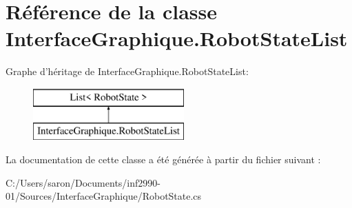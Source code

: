 \hypertarget{class_interface_graphique_1_1_robot_state_list}{\section{Référence de la classe Interface\-Graphique.\-Robot\-State\-List}
\label{class_interface_graphique_1_1_robot_state_list}
}
Graphe d'héritage de Interface\-Graphique.\-Robot\-State\-List\-:\begin{figure}[H]
\begin{center}
\leavevmode
\includegraphics[height=2.000000cm]{class_interface_graphique_1_1_robot_state_list}
\end{center}
\end{figure}


La documentation de cette classe a été générée à partir du fichier suivant \-:\begin{DoxyCompactItemize}
\item 
C\-:/\-Users/saron/\-Documents/inf2990-\/01/\-Sources/\-Interface\-Graphique/Robot\-State.\-cs\end{DoxyCompactItemize}
